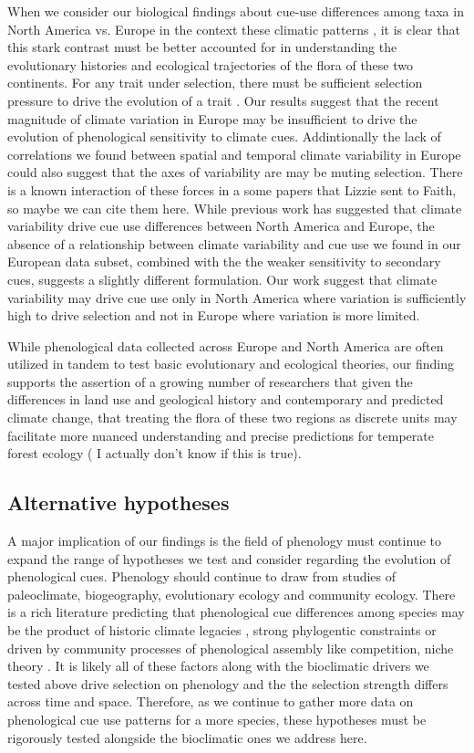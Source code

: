 \documentclass[12pt]{article}\usepackage[]{graphicx}\usepackage[]{color}
\begin{document}
\noindent When we consider our biological findings about cue-use differences among taxa in North America vs. Europe in the context these climatic patterns , it is clear that this stark contrast must be better accounted for in understanding the evolutionary histories and ecological trajectories of the flora of these two continents. For any trait under selection, there must be sufficient selection pressure to drive the evolution of a trait \citep{}. Our results suggest that the recent magnitude of climate variation in Europe may be insufficient to drive the evolution of phenological sensitivity to climate cues. Addintionally the lack of correlations we found between spatial and temporal climate variability in Europe could also suggest  that the axes of variability are may be muting selection. There is a known interaction of these forces in a some papers that Lizzie sent to Faith, so maybe we can cite them here. While previous work has suggested that climate variability drive cue use differences between North America and Europe, the absence of a relationship between climate variability and cue use we found in our European data subset, combined with the the weaker sensitivity to secondary cues, suggests a slightly different formulation. Our work suggest that climate variability may drive cue use only in North America where variation is sufficiently high to drive selection and not in Europe where variation is more limited. 

\noindeny While phenological data collected across Europe and North America are often utilized in tandem to test basic evolutionary and ecological theories, our finding supports the assertion of a growing number of researchers that given the differences in land use and geological history and contemporary and predicted climate change, that treating the flora of these two regions as discrete units may facilitate more nuanced understanding and precise predictions for temperate forest ecology ( I actually don't know if this is true).

\subsection*{Alternative hypotheses}

A major implication of our findings is the field of phenology must continue to expand the range of hypotheses we test and consider regarding the evolution of phenological cues. Phenology should continue to draw from studies of paleoclimate, biogeography, evolutionary ecology and community ecology. There is a rich literature predicting that phenological cue differences among species may be the product of historic climate legacies \citep{}, strong phylogentic constraints \citep{} or driven by community processes of phenological assembly like competition, niche theory  \citep{}. It is likely all of these factors along with the bioclimatic drivers we tested above drive selection on phenology and the the selection strength differs across time and space. Therefore, as we continue to gather more data on phenological cue use patterns for a more species, these hypotheses must be rigorously tested alongside the bioclimatic ones we address here.
\end{document}
